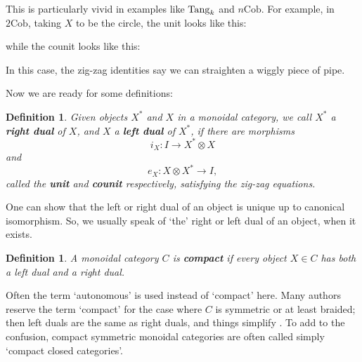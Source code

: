 \documentclass[12pt,twoside,openright]{report}
\newtheorem{definition}[thm]{Definition}
\newcommand{\Cob}{\mathrm{Cob}}
\newcommand{\Tang}{{\rm Tang}}
\newcommand{\maps}{\colon}
\newcommand{\tensor}{\otimes}
\newcommand{\zagc}{
  \begin{scope}[left color=gray, right color=white]
    \shadedraw (1.5,0) .. controls (1.6,2) and (-1.6,2) .. (-1.5,0)
      .. controls (-1.4,-.25) and (-.6,-.25) .. (-.5,0)
      .. controls (-.6,.8) and (0.6,.8) .. (.5,0)
      .. controls (.6,-.25) and (1.4,-.25) .. (1.5,0);
  \end{scope}
  \draw [dashed] (1.5, 0) arc (0:180:.5 and 0.2);
  \draw [dashed] (-.5, 0) arc (0:180:.5 and 0.2);
}
\newcommand{\zigc}{
  \begin{scope}[left color=gray, right color=white]
    \shadedraw (1.5,2) .. controls (1.6,0) and (-1.6,0) .. (-1.5,2)
      -- (-.5,2)
      .. controls (-.6,1.2) and (0.6,1.2) .. (.5,2)
      -- (1.5,2);
    \shadedraw (1,2) ellipse (.5 and .2);
    \shadedraw (-1,2) ellipse (.5 and .2);
  \end{scope}
}
\begin{document}
This is particularly vivid in examples like $\Tang_k$ and $n\Cob$. For example, in $2\Cob$, taking $X$ to be the circle, the unit looks like this:
\begin{center}
\end{center}
while the counit looks like this:
\begin{center}
\end{center}
In this case, the zig-zag identities say we can straighten a wiggly piece of pipe.

Now we are ready for some definitions:

\begin{definition} Given objects $X^*$ and $X$ in a monoidal category, we call $X^*$ a {\bf right dual} of $X$, and $X$ 
a {\bf left dual} of $X^*$, if there are morphisms
\[           i_X \maps I \to X^* \tensor X  \]
and 
\[           e_X \maps X \tensor X^* \to I, \]
called the {\bf unit} and {\bf counit} respectively, satisfying the zig-zag equations.
\end{definition}
One can show that the left or right dual of an object is unique up to canonical isomorphism.   So, we usually speak of `the' right or left dual of an object, when it exists.

\begin{definition} A monoidal category $C$ is {\bf compact}
if every object $X \in C$ has both a left dual and a right dual.
\end{definition}
Often the term `autonomous' is used instead of 
`compact' here.  Many authors reserve the term `compact' for the case where $C$ is symmetric or at least braided; then left duals are the same as right duals, and things simplify \cite{FY}. To add to the confusion, compact symmetric monoidal categories are often called simply `compact closed categories'.
\end{document}
